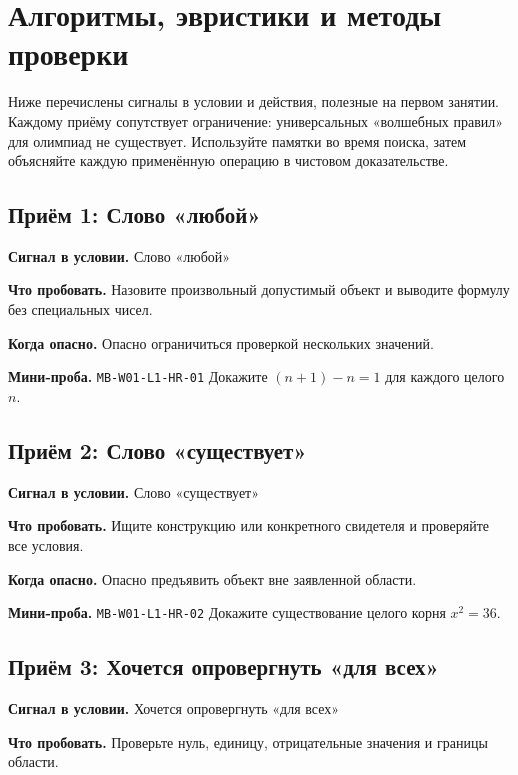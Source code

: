 \documentclass[11pt,a4paper,openany]{book}
\newcommand{\muid}[1]{\texttt{\footnotesize #1}}
\begin{document}
\chapter{Алгоритмы, эвристики и методы проверки}
Ниже перечислены сигналы в условии и действия, полезные на первом занятии. Каждому приёму сопутствует ограничение: универсальных «волшебных правил» для олимпиад не существует. Используйте памятки во время поиска, затем объясняйте каждую применённую операцию в чистовом доказательстве.

\section{Приём 1: Слово «любой»}

\begin{keybox}\textbf{Сигнал в условии.} Слово «любой»\par \textbf{Что пробовать.} Назовите произвольный допустимый объект и выводите формулу без специальных чисел.\end{keybox}

\textbf{Когда опасно.} Опасно ограничиться проверкой нескольких значений.\par \textbf{Мини-проба.} \muid{MB-W01-L1-HR-01} Докажите $(n+1)-n=1$ для каждого целого $n$.


\section{Приём 2: Слово «существует»}

\begin{keybox}\textbf{Сигнал в условии.} Слово «существует»\par \textbf{Что пробовать.} Ищите конструкцию или конкретного свидетеля и проверяйте все условия.\end{keybox}

\textbf{Когда опасно.} Опасно предъявить объект вне заявленной области.\par \textbf{Мини-проба.} \muid{MB-W01-L1-HR-02} Докажите существование целого корня $x^2=36$.


\section{Приём 3: Хочется опровергнуть «для всех»}

\begin{keybox}\textbf{Сигнал в условии.} Хочется опровергнуть «для всех»\par \textbf{Что пробовать.} Проверьте нуль, единицу, отрицательные значения и границы области.\end{keybox}
\end{document}
